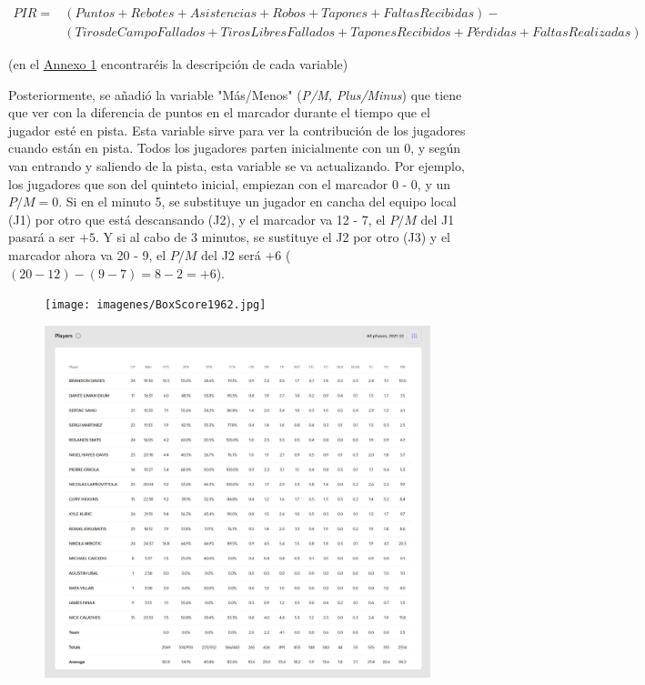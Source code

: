 \documentclass[paper=a4, fontsize=9pt]{article}
\begin{document}
\begin{equation} \label{eq1}
  \begin{split}
  PIR = & (Puntos + Rebotes + Asistencias + Robos + Tapones + Faltas Recibidas) - \\
  & (Tiros de Campo Fallados + Tiros Libres Fallados + Tapones Recibidos + Pérdidas + Faltas Realizadas)
  \end{split}
\end{equation}

\centerline{(en el \hyperref[sec:Annexo1]{Annexo 1} encontraréis la descripción de cada variable)}

\vspace{0.2cm}

Posteriormente, se añadió la variable "Más/Menos" (\emph{P/M, Plus/Minus}) que tiene que ver con la diferencia de puntos en el marcador durante el tiempo que el jugador esté en pista. Esta variable sirve para ver la contribución de los jugadores cuando están en pista. Todos los jugadores parten inicialmente con un 0, y según van entrando y saliendo de la pista, esta variable se va actualizando. Por ejemplo, los jugadores que son del quinteto inicial, empiezan con el marcador 0 - 0, y un $P/M = 0$. Si en el minuto 5, se substituye un jugador en cancha del equipo local (J1) por otro que está descansando (J2), y el marcador va 12 - 7, el $P/M$ del J1 pasará a ser $+5$. Y si al cabo de 3 minutos, se sustituye el J2 por otro (J3) y el marcador ahora va 20 - 9, el $P/M$ del J2 será $+6$ ($(20-12) - (9-7) = 8 - 2 = +6$).

\begin{figure}[H]
\centering
\begin{minipage}{.5\textwidth}
\centering
\captionsetup{width=.8\linewidth}
\texttt{[image: imagenes/BoxScore1962.jpg]}
\label{fig:BoxScore1962}
\end{minipage}%
\begin{minipage}{.5\textwidth}
\centering
\captionsetup{width=.8\linewidth}
\includegraphics[width=.7\linewidth]{imagenes/BoxScore2022.jpg}
\label{fig:BoxScore2022}
\end{minipage}
\end{figure}
\end{document}
